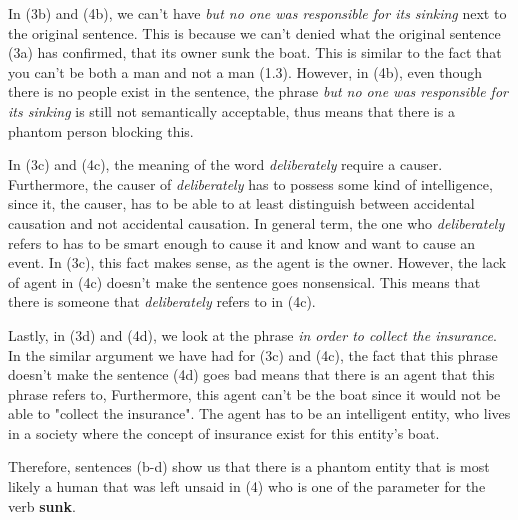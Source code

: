 \documentclass{article}
\begin{document}
In (3b) and (4b), we can't have \textit{but no one was responsible for its sinking} next to the original sentence. This is because we can't denied what the original sentence (3a) has confirmed, that its owner sunk the boat. This is similar to the fact that you can't be both a man and not a man (1.3). However, in (4b), even though there is no people exist in the sentence, the phrase \textit{but no one was responsible for its sinking} is still not semantically acceptable, thus means that there is a phantom person blocking this.


In (3c) and (4c), the meaning of the word \textit{deliberately} require a causer. Furthermore, the causer of \textit{deliberately} has to possess some kind of intelligence, since it, the causer, has to be able to at least distinguish between accidental causation and not accidental causation. In general term, the one who \textit{deliberately} refers to has to be smart enough to cause it and know and want to cause an event. In (3c), this fact makes sense, as the agent is the owner. However, the lack of agent in (4c) doesn't make the sentence goes nonsensical. This means that there is someone that \textit{deliberately} refers to in (4c). 

Lastly, in (3d) and (4d), we look at the phrase \textit{in order to collect the insurance}. In the similar argument we have had for (3c) and (4c), the fact that this phrase doesn't make the sentence (4d) goes bad means that there is an agent that this phrase refers to, Furthermore, this agent can't be the boat since it would not be able to "collect the insurance". The agent has to be an intelligent entity, who lives in a society where the concept of insurance exist for this entity's boat. 

Therefore, sentences (b-d) show us that there is a phantom entity that is most likely a human that was left unsaid in (4) who is one of the parameter for the verb \textbf{sunk}. 
\end{document}
